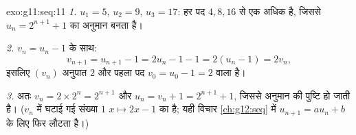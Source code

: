 \begin{solution}{exo:g11:seq:11}
\emph{1.} $u_1 = 5$, $u_2 = 9$, $u_3 = 17$: हर पद $4, 8, 16$ से एक अधिक है, जिससे $u_n = 2^{n+1} + 1$ का
अनुमान बनता है।

\emph{2.} $v_n = u_n - 1$ के साथ:
\[
v_{n+1} = u_{n+1} - 1 = 2u_n - 1 - 1 = 2(u_n - 1) = 2v_n,
\]
इसलिए $(v_n)$ अनुपात $2$ और पहला पद $v_0 = u_0 - 1 = 2$ वाला  है।

\emph{3.} अतः $v_n = 2 \times 2^n = 2^{n+1}$ और $u_n = v_n + 1 = 2^{n+1} + 1$, जिससे अनुमान की पुष्टि हो जाती है। ($v_n$ में
घटाई गई संख्या $1$ $x \mapsto 2x - 1$ का  है; यही विचार \cref{ch:g12:seq} में $u_{n+1} = au_n + b$ के
लिए फिर लौटता है।)
\end{solution}

